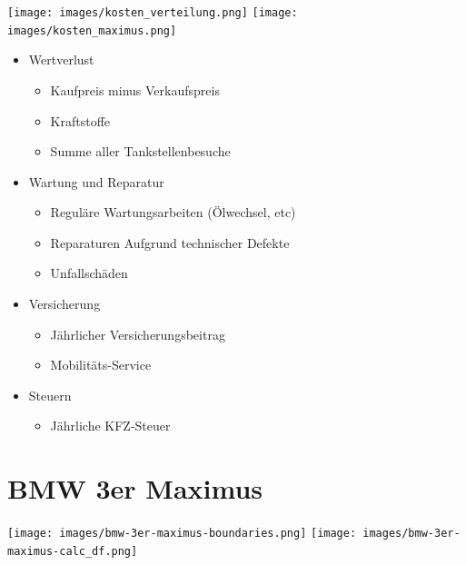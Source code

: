 \documentclass[landscape, DIV=99, 14pt]{scrartcl}
\begin{document}
\twocolumn
\texttt{[image: images/kosten\_verteilung.png]}
\texttt{[image: images/kosten\_maximus.png]}

\pagebreak

\begin{itemize}
    \item Wertverlust
    \begin{itemize}
        \item Kaufpreis minus Verkaufspreis
        \item Kraftstoffe
        \item Summe aller Tankstellenbesuche
    \end{itemize}
    \item Wartung und Reparatur
    \begin{itemize}
        \item Regul\"are Wartungsarbeiten (\"Olwechsel, etc)
        \item Reparaturen Aufgrund technischer Defekte
        \item Unfallsch\"aden
    \end{itemize}
    \item Versicherung
    \begin{itemize}
        \item J\"ahrlicher Versicherungsbeitrag
        \item Mobilit\"ats-Service
    \end{itemize}
    \item Steuern
    \begin{itemize}
            \item J\"ahrliche KFZ-Steuer
    \end{itemize}
\end{itemize}


\twocolumn

\section*{BMW 3er Maximus}
\begin{center}
\texttt{[image: images/bmw-3er-maximus-boundaries.png]}
\null
\vspace{0.5cm}
\texttt{[image: images/bmw-3er-maximus-calc\_df.png]}
\end{center}
\end{document}
